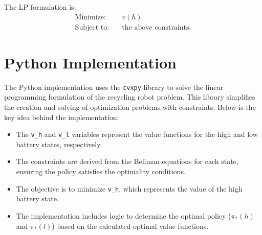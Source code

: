 \documentclass[12pt,a4paper]{article}
\begin{document}
The LP formulation is:
\begin{align*}
    \text{Minimize:} & \quad v(h) \\
    \text{Subject to:} & \quad \text{the above constraints.}
\end{align*}

\section{Python Implementation}
The Python implementation uses the \texttt{cvxpy} library to solve the linear programming formulation of the recycling robot problem. This library simplifies the creation and solving of optimization problems with constraints. Below is the key idea behind the implementation:

\begin{itemize}
    \item The \texttt{v\_h} and \texttt{v\_l} variables represent the value functions for the high and low battery states, respectively.
    \item The constraints are derived from the Bellman equations for each state, ensuring the policy satisfies the optimality conditions.
    \item The objective is to minimize \texttt{v\_h}, which represents the value of the high battery state.
    \item The implementation includes logic to determine the optimal policy (\(\pi_*(h)\) and \(\pi_*(l)\)) based on the calculated optimal value functions.
\end{itemize}
\end{document}
